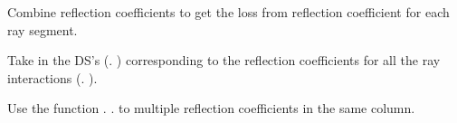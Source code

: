 \documentclass[letterpaper,10pt,english]{sphinxmanual}
\begin{document}

\begin{fulllineitems}
\label{\detokenize{index:RayTracerMainProgram.RefCombine}}
Combine reflection coefficients to get the loss from reflection   coefficient for each ray segment.

Take in the DS’s ({\hyperref[\detokenize{index:module-DictionarySparseMatrix}]{}}. )  corresponding to the reflection coefficients for all the ray   interactions ({\hyperref[\detokenize{index:module-DictionarySparseMatrix}]{}}. ).

Use the function {\hyperref[\detokenize{index:module-DictionarySparseMatrix}]{}}. .    to multiple reflection coefficients in the same column.


\end{fulllineitems}
\end{document}
